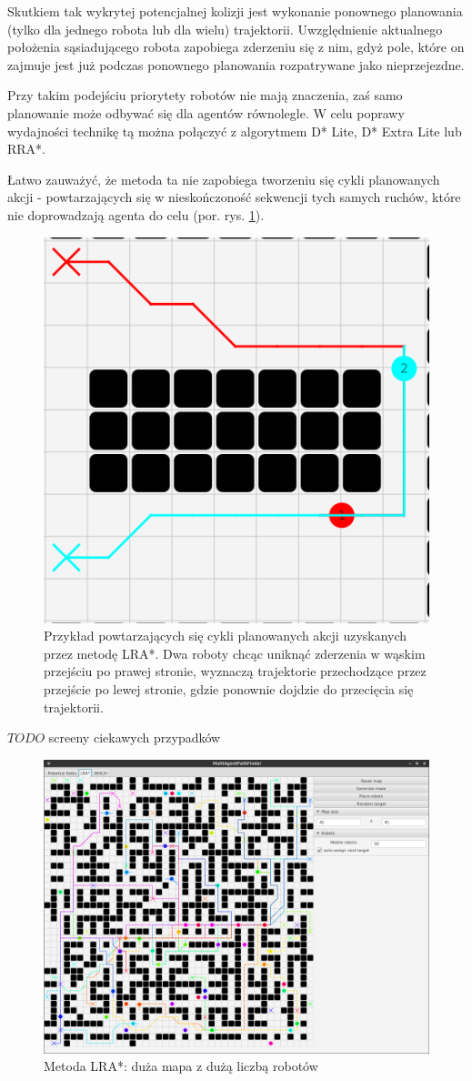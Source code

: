 
Skutkiem tak wykrytej potencjalnej kolizji jest wykonanie ponownego planowania (tylko dla jednego robota lub dla wielu) trajektorii. Uwzględnienie aktualnego położenia sąsiadującego robota zapobiega zderzeniu się z nim, gdyż pole, które on zajmuje jest już podczas ponownego planowania rozpatrywane jako nieprzejezdne.

Przy takim podejściu priorytety robotów nie mają znaczenia, zaś samo planowanie może odbywać się dla agentów równolegle.
W celu poprawy wydajności technikę tą można połączyć z algorytmem D* Lite, D* Extra Lite lub RRA*.

Łatwo zauważyć, że metoda ta nie zapobiega tworzeniu się cykli planowanych akcji - powtarzających się w nieskończoność sekwencji tych samych ruchów, które nie doprowadzają agenta do celu (por. rys. \ref{fig:robopath-lra-cycle}).

\begin{figure}
	\centering
	\includegraphics[width=0.45\columnwidth]{img/robopath/lra-cycle}
	\caption{Przykład powtarzających się cykli planowanych akcji uzyskanych przez metodę LRA*. Dwa roboty chcąc uniknąć zderzenia w wąskim przejściu po prawej stronie, wyznaczą trajektorie przechodzące przez przejście po lewej stronie, gdzie ponownie dojdzie do przecięcia się trajektorii.}
	\label{fig:robopath-lra-cycle}
\end{figure}


$TODO$ screeny ciekawych przypadków
\begin{figure}
	\centering
	\includegraphics[width=0.8\columnwidth]{img/robopath/lra-bigmap}
	\caption{Metoda LRA*: duża mapa z dużą liczbą robotów}
	\label{fig:test-lra-bigmap}
\end{figure}

